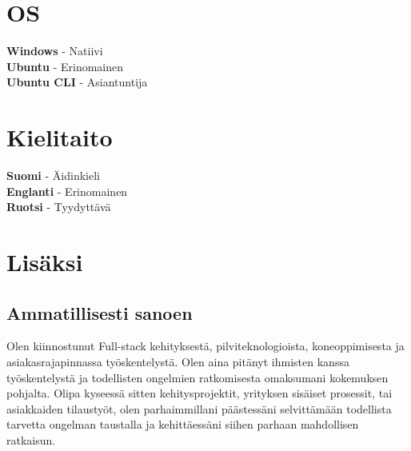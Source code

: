 \documentclass[letterpaper]{twentysecondcv}
\begin{document}



\begin{minipage}[t]{0.5\textwidth}
  \vspace{-\baselineskip} %

  \section{OS}

  \textbf{Windows} - Natiivi \\
  \textbf{Ubuntu} - Erinomainen \\
  \textbf{Ubuntu CLI} - Asiantuntija


\end{minipage}
\hfill
\begin{minipage}[t]{0.5\textwidth}
  \vspace{-\baselineskip} %

  \section{Kielitaito}

  \textbf{Suomi} - Äidinkieli \\
  \textbf{Englanti} - Erinomainen \\
  \textbf{Ruotsi} - Tyydyttävä \\

\end{minipage}



\section{Lisäksi}


\subsection{Ammatillisesti sanoen}

Olen kiinnostunut Full-stack kehityksestä, pilviteknologioista, koneoppimisesta ja asiakasrajapinnassa työskentelystä.
Olen aina pitänyt ihmisten kanssa työskentelystä ja todellisten ongelmien ratkomisesta omaksumani kokemuksen pohjalta.
Olipa kyseessä sitten kehitysprojektit, yrityksen sisäiset prosessit,
tai asiakkaiden tilaustyöt,
olen parhaimmillani päästessäni selvittämään todellista tarvetta ongelman taustalla
ja kehittäessäni siihen parhaan mahdollisen ratkaisun.
\end{document}
